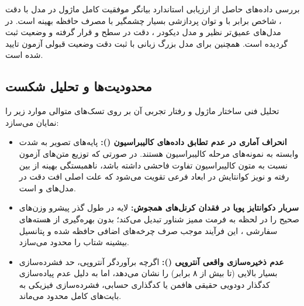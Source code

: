 بررسی داده‌های حاصل از ارزیابی استاندارد بیانگر موفقیت کامل ماژول در مدل  با دقت ، شاخص  برابر با  و توان پردازشی بسیار چشمگیر  با مصرف حافظه بهینه  است. در مدل‌های عمیق‌تر نظیر  و مدل دیکودر ، دقت در سطح  و  قرار گرفته و وضعیت  ثبت گردیده است. همچنین برای مدل بزرگ زبانی  با ثبت دقت  وضعیت قبولی آزمون تایید شده است.

\subsection{محدودیت‌ها و تحلیل شکست}
تحلیل فنی ساختار ماژول و رفتار تجربی آن بر روی تسک‌های متوالی موارد زیر را نمایان می‌سازد:
\begin{itemize}
    \item \textbf{انحراف آماری در عدم تطابق داده‌های کالیبراسیون ():} پایه‌های تصویر  به شدت وابسته به نمونه‌های مرحله کالیبراسیون هستند. در صورتی که توزیع متن‌های آزمون نسبت به متون کالیبراسیون تفاوت فاحشی داشته باشد، ناهمبستگی بهینه از بین رفته و نویز کوانتایش در ابعاد فرعی تقویت می‌شود که علت اصلی افت دقت در مدل‌های  و  است.
    \item \textbf{سربار دکوانتایز پویا در فقدان کرنل‌های همجوش:} لایه  در طول گذر پیشرو وزن‌های صحیح را در لحظه به فرمت ممیز شناور تبدیل می‌کند؛ بدون بهره‌گیری از هسته‌های سفارشی ، این فرآیند موجب صرف چرخه‌های اضافی حافظه شده و پتانسیل بیشینه شتاب را محدود می‌سازد.
    \item \textbf{عدم ذخیره‌سازی واقعی آنتروپی ():} اگرچه برآوردگر آنتروپی، حد فشرده‌سازی بسیار بالایی (تا بیش از ۸ برابر) را نشان می‌دهد، اما به دلیل عدم پیاده‌سازی کدگذار دودویی حقیقی هافمن یا کدگذاری حسابی، فشرده‌سازی فیزیکی به بایت‌های کامل محدود می‌ماند.
\end{itemize}
